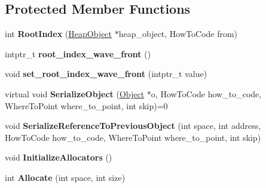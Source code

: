 \subsection*{Protected Member Functions}
\begin{DoxyCompactItemize}
\item 
\hypertarget{classv8_1_1internal_1_1_serializer_a435731101a42ac937c8f0aabc0e5175d}{}int {\bfseries Root\+Index} (\hyperlink{classv8_1_1internal_1_1_heap_object}{Heap\+Object} $\ast$heap\+\_\+object, How\+To\+Code from)\label{classv8_1_1internal_1_1_serializer_a435731101a42ac937c8f0aabc0e5175d}

\item 
\hypertarget{classv8_1_1internal_1_1_serializer_adf1ffc6132f922617547c556733adeb7}{}intptr\+\_\+t {\bfseries root\+\_\+index\+\_\+wave\+\_\+front} ()\label{classv8_1_1internal_1_1_serializer_adf1ffc6132f922617547c556733adeb7}

\item 
\hypertarget{classv8_1_1internal_1_1_serializer_ac709652fbaeaaa31153620c4d818f527}{}void {\bfseries set\+\_\+root\+\_\+index\+\_\+wave\+\_\+front} (intptr\+\_\+t value)\label{classv8_1_1internal_1_1_serializer_ac709652fbaeaaa31153620c4d818f527}

\item 
\hypertarget{classv8_1_1internal_1_1_serializer_a29b43782fb41e7922cc3bdb5957c0ef4}{}virtual void {\bfseries Serialize\+Object} (\hyperlink{classv8_1_1internal_1_1_object}{Object} $\ast$o, How\+To\+Code how\+\_\+to\+\_\+code, Where\+To\+Point where\+\_\+to\+\_\+point, int skip)=0\label{classv8_1_1internal_1_1_serializer_a29b43782fb41e7922cc3bdb5957c0ef4}

\item 
\hypertarget{classv8_1_1internal_1_1_serializer_a7fd18a4c9b076a43cd8ab9cc04881915}{}void {\bfseries Serialize\+Reference\+To\+Previous\+Object} (int space, int address, How\+To\+Code how\+\_\+to\+\_\+code, Where\+To\+Point where\+\_\+to\+\_\+point, int skip)\label{classv8_1_1internal_1_1_serializer_a7fd18a4c9b076a43cd8ab9cc04881915}

\item 
\hypertarget{classv8_1_1internal_1_1_serializer_a1ab90efb90dfb98ac429de1b58197607}{}void {\bfseries Initialize\+Allocators} ()\label{classv8_1_1internal_1_1_serializer_a1ab90efb90dfb98ac429de1b58197607}

\item 
\hypertarget{classv8_1_1internal_1_1_serializer_a58d333570b469d7a057e097aaf32509d}{}int {\bfseries Allocate} (int space, int size)\label{classv8_1_1internal_1_1_serializer_a58d333570b469d7a057e097aaf32509d}


\end{DoxyCompactItemize}
